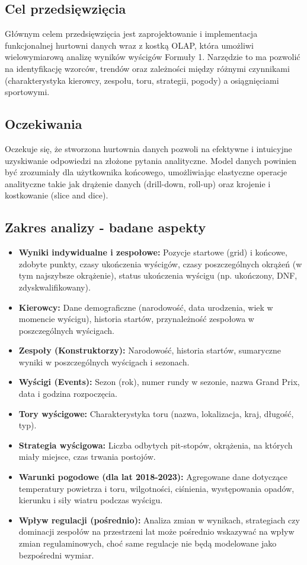 \documentclass[a4paper,12pt]{article}
\begin{document}
\subsection{Cel przedsięwzięcia}
Głównym celem przedsięwzięcia jest zaprojektowanie i implementacja funkcjonalnej hurtowni danych wraz z kostką OLAP, która umożliwi wielowymiarową analizę wyników wyścigów Formuły 1. Narzędzie to ma pozwolić na identyfikację wzorców, trendów oraz zależności między różnymi czynnikami (charakterystyka kierowcy, zespołu, toru, strategii, pogody) a osiągnięciami sportowymi.

\subsection{Oczekiwania}
Oczekuje się, że stworzona hurtownia danych pozwoli na efektywne i intuicyjne uzyskiwanie odpowiedzi na złożone pytania analityczne. Model danych powinien być zrozumiały dla użytkownika końcowego, umożliwiając elastyczne operacje analityczne takie jak drążenie danych (drill-down, roll-up) oraz krojenie i kostkowanie (slice and dice).

\subsection{Zakres analizy - badane aspekty}
\begin{itemize}[label=\textbullet, leftmargin=*]
  \item \textbf{Wyniki indywidualne i zespołowe:} Pozycje startowe (grid) i końcowe, zdobyte punkty, czasy ukończenia wyścigów, czasy poszczególnych okrążeń (w tym najszybsze okrążenie), status ukończenia wyścigu (np. ukończony, DNF, zdyskwalifikowany).
  \item \textbf{Kierowcy:} Dane demograficzne (narodowość, data urodzenia, wiek w momencie wyścigu), historia startów, przynależność zespołowa w poszczególnych wyścigach.
  \item \textbf{Zespoły (Konstruktorzy):} Narodowość, historia startów, sumaryczne wyniki w poszczególnych wyścigach i sezonach.
  \item \textbf{Wyścigi (Events):} Sezon (rok), numer rundy w sezonie, nazwa Grand Prix, data i godzina rozpoczęcia.
  \item \textbf{Tory wyścigowe:} Charakterystyka toru (nazwa, lokalizacja, kraj, długość, typ).
  \item \textbf{Strategia wyścigowa:} Liczba odbytych pit-stopów, okrążenia, na których miały miejsce, czas trwania postojów.
  \item \textbf{Warunki pogodowe (dla lat 2018-2023):} Agregowane dane dotyczące temperatury powietrza i toru, wilgotności, ciśnienia, występowania opadów, kierunku i siły wiatru podczas wyścigu.
  \item \textbf{Wpływ regulacji (pośrednio):} Analiza zmian w wynikach, strategiach czy dominacji zespołów na przestrzeni lat może pośrednio wskazywać na wpływ zmian regulaminowych, choć same regulacje nie będą modelowane jako bezpośredni wymiar.
\end{itemize}
\end{document}
